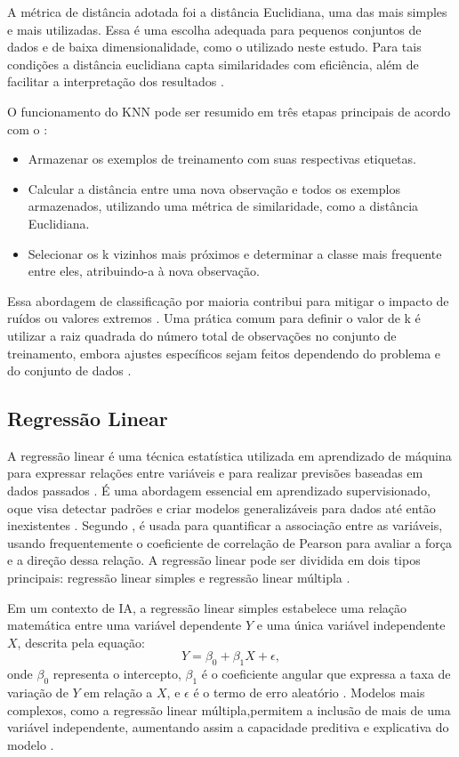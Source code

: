 A métrica de distância adotada foi a distância Euclidiana, uma das mais simples e mais utilizadas. Essa é uma escolha adequada para pequenos conjuntos de dados e de baixa dimensionalidade, como o utilizado neste estudo. Para tais condições a distância euclidiana capta similaridades com eficiência, além de facilitar a interpretação dos resultados \cite{elkan2011}.

O funcionamento do KNN pode ser resumido em três etapas principais de acordo com o :
\begin{itemize}
    \item Armazenar os exemplos de treinamento com suas respectivas etiquetas.
    \item Calcular a distância entre uma nova observação e todos os exemplos armazenados, utilizando uma métrica de similaridade, como a distância Euclidiana.
    \item Selecionar os k vizinhos mais próximos e determinar a classe mais frequente entre eles, atribuindo-a à nova observação.
\end{itemize}

Essa abordagem de classificação por maioria contribui para mitigar o impacto de ruídos ou valores extremos \cite{elkan2011}. Uma prática comum para definir o valor de k é utilizar a raiz quadrada do número total de observações no conjunto de treinamento, embora ajustes específicos sejam feitos dependendo do problema e do conjunto de dados \cite{elkan2011}.

\subsection{Regressão Linear}
A regressão linear é uma técnica estatística utilizada em aprendizado de máquina para expressar relações entre variáveis e para realizar previsões baseadas em dados passados \cite{rodrigues}. É uma abordagem essencial em aprendizado supervisionado, oque visa detectar padrões e criar modelos generalizáveis para dados até então inexistentes \cite{soto}. Segundo ,  é usada para quantificar a associação entre as variáveis, usando frequentemente o coeficiente de correlação de Pearson para avaliar a força e a direção dessa relação. A regressão linear pode ser dividida em dois tipos principais: regressão linear simples e regressão linear múltipla \cite{soto}.

Em um contexto de IA, a regressão linear simples estabelece uma relação matemática entre uma variável dependente \( Y \) e uma única variável independente \( X \), descrita pela equação:
\[
Y = \beta_0 + \beta_1 X + \epsilon,
\]
onde \( \beta_0 \) representa o intercepto, \( \beta_1 \) é o coeficiente angular que expressa a taxa de variação de \( Y \) em relação a \( X \), e \( \epsilon \) é o termo de erro aleatório \cite{rodrigues}. Modelos mais complexos, como a regressão linear múltipla,permitem a inclusão de mais de uma variável independente, aumentando assim a capacidade preditiva e explicativa do modelo \cite{rodrigues}.

